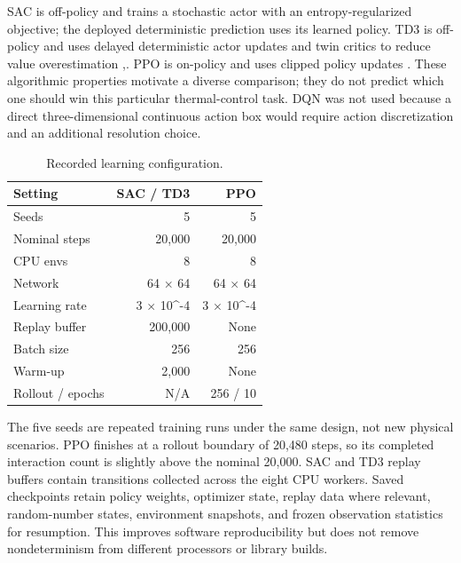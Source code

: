 \documentclass[conference]{IEEEtran}
\begin{document}
SAC is off-policy and trains a stochastic actor with an entropy-regularized objective; the deployed deterministic prediction uses its learned policy. TD3 is off-policy and uses delayed deterministic actor updates and twin critics to reduce value overestimation \cite{r3},\cite{r4}. PPO is on-policy and uses clipped policy updates \cite{r5}. These algorithmic properties motivate a diverse comparison; they do not predict which one should win this particular thermal-control task. DQN was not used because a direct three-dimensional continuous action box would require action discretization and an additional resolution choice.

\begin{table}[t]
\caption{Recorded learning configuration.}
\label{tab:VIII}
\centering\footnotesize
\begin{tabular}{lrr}
\toprule
Setting & SAC / TD3 & PPO\\
\midrule
Seeds & 5 & 5\\
Nominal steps & 20,000 & 20,000\\
CPU envs & 8 & 8\\
Network & 64 $\times$ 64 & 64 $\times$ 64\\
Learning rate & 3 $\times$ 10\textasciicircum{}-4 & 3 $\times$ 10\textasciicircum{}-4\\
Replay buffer & 200,000 & None\\
Batch size & 256 & 256\\
Warm-up & 2,000 & None\\
Rollout / epochs & N/A & 256 / 10\\
\bottomrule
\end{tabular}
\end{table}
The five seeds are repeated training runs under the same design, not new physical scenarios. PPO finishes at a rollout boundary of 20,480 steps, so its completed interaction count is slightly above the nominal 20,000. SAC and TD3 replay buffers contain transitions collected across the eight CPU workers. Saved checkpoints retain policy weights, optimizer state, replay data where relevant, random-number states, environment snapshots, and frozen observation statistics for resumption. This improves software reproducibility but does not remove nondeterminism from different processors or library builds.
\end{document}
